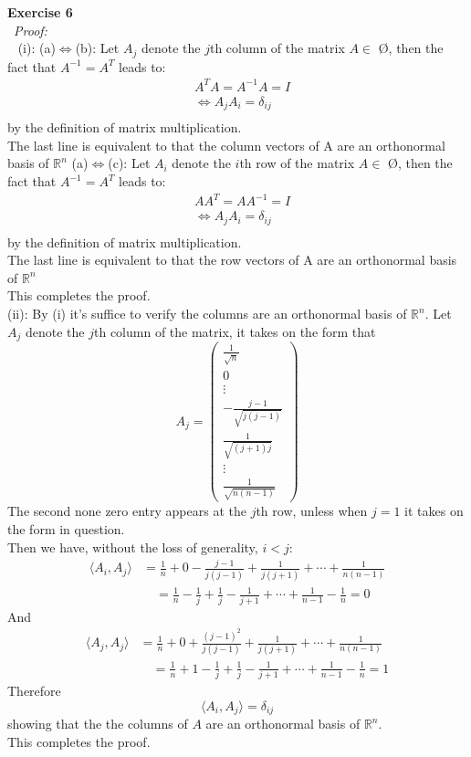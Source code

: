 \documentclass[12pt]{article}
\def\dotp#1#2{\langle#1,#2\rangle}
\def\ep#1#2{{\bf Exercise #1}\\~{\it Proof:}\\~#2\\[1em]}
\def\inn#1#2{(#1): #2\\[0.5em]}
\def\ff#1#2{\frac{#1}{#2}}
\newcommand{\eq}[1]{\begin{align*}#1\end{align*}}
\newcommand{\mm}[1]{\begin{pmatrix}#1\end{pmatrix}}
\def\sq#1{\sqrt{#1}}
\begin{document}
 \ep{6}{
 	\inn{i}{
	(a)$\iff$(b): Let $A_j$ denote the $j$th column of the matrix $A\in$ \O, 
	then the fact that $A^{-1}=A^{T}$ leads to:
	\eq{
	&A^{T}A=A^{-1}A=I\\
	&\iff A_jA_i=\delta_{ij}\\
	}
	by the definition of matrix multiplication.\\
	The last line is equivalent to that the column vectors of A are an orthonormal basis of $\mathbb{R}^n$
	(a)$\iff$(c):
	 Let $A_i$ denote the $i$th row of the matrix $A\in$ \O, 
	then the fact that $A^{-1}=A^{T}$ leads to:
	\eq{
	&AA^{T}=AA^{-1}=I\\
	&\iff A_jA_i=\delta_{ij}\\
	}
	by the definition of matrix multiplication.\\
	The last line is equivalent to that the row vectors of A are an orthonormal basis of $\mathbb{R}^n$\\
	This completes the proof.
	}
	\inn{ii}{
	By (i) it's suffice to verify the columns are an orthonormal basis of $\mathbb{R}^n$. 
	Let $A_j$ denote the $j$th column of the matrix, it takes on the form that 
	\[
	A_j=\mm{
	\ff{1}{\sq{n}}\\
	0\\
	\vdots\\
	-\ff{j-1}{\sq{j(j-1)}}\\
	\ff{1}{\sq{(j+1)j}}\\
	\vdots\\
	\ff{1}{\sq{n(n-1)}}
	}
	\]
	The second none zero entry appears at the $j$th row, unless when $j=1$ it takes on the form in question.
	}
	Then we have, without the loss of generality, $i<j$:
	\eq{
	\dotp{A_i}{A_j}&=\ff{1}{n}+0-\ff{j-1}{j(j-1)}+\ff{1}{j(j+1)}	+\cdots+\ff{1}{n(n-1)}\\
			      &\quad=\ff{1}{n}-\ff{1}{j}+\ff{1}{j}-\ff{1}{j+1}	+\cdots+\ff{1}{n-1}-\ff{1}{n}=0
	}
	And
	\eq{
	\dotp{A_j}{A_j}&=\ff{1}{n}+0+\ff{(j-1)^2}{j(j-1)}+\ff{1}{j(j+1)}	+\cdots+\ff{1}{n(n-1)}\\
			      &\quad=\ff{1}{n}+1-\ff{1}{j}+\ff{1}{j}-\ff{1}{j+1}	+\cdots+\ff{1}{n-1}-\ff{1}{n}=1
	}
	Therefore
	\[
	\dotp{A_i}{A_j}=\delta_{ij}
	\]
	showing that the the columns of $A$ are an orthonormal basis of $\mathbb{R}^n$. \\
	This completes the proof.
 }
\end{document}
